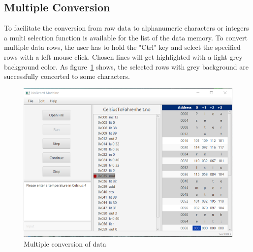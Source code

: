 \subsection{Multiple Conversion}
To facilitate the conversion from raw data to alphanumeric characters or integers a multi selection function is available for the list of the data memory.
To convert multiple data rows, the user has to hold the "Ctrl" key and select the specified rows with a left mouse click. Chosen lines will get highlighted with a light grey background color. As figure~\ref{fig:multipleConversion} shows, the selected rows with grey background are successfully concerted to some characters.
\begin{figure}[h] 
	\centering
	\includegraphics[scale=.85]{images/screenshot-5.png}
	\caption{Multiple conversion of data}
	\label{fig:multipleConversion}
\end{figure}
